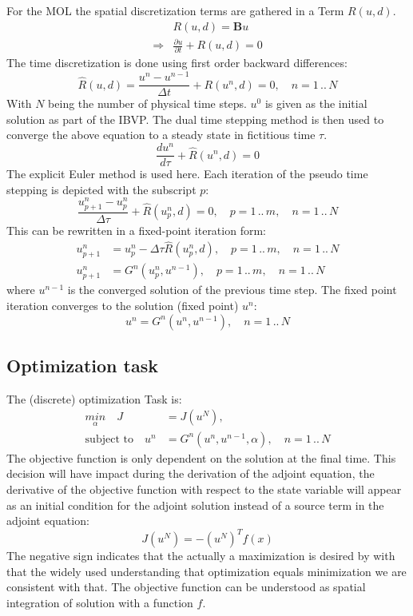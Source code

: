 For the MOL the spatial discretization terms are gathered in a Term $R(u,d)$.
\begin{align}
&R(u,d) = \mathbf{B}u  \\
\Rightarrow & \frac{\partial u}{\partial t} + R(u,d) = 0
\end{align}
The time discretization is done using first order backward differences:
\begin{equation}
\hat R (u,d) = \frac{u^{n} - u^{n-1}}{\Delta t} + R(u^n,d) = 0,\quad n= 1\,..\,N
\end{equation}
With $N$ being the number of physical time steps. $u^0$ is given as the initial solution as part of the IBVP. The dual time stepping method is then used to converge the above equation to a steady state in fictitious time $\tau$. 
\begin{equation}
\frac{d u^n}{d\tau} + \hat R(u^{n},d) = 0
\end{equation} 
The explicit Euler method is used here. Each iteration of the pseudo time stepping is depicted with the subscript $p$:
\begin{equation}
\frac{u^n_{p+1}-u^n_{p}}{\Delta\tau} + \hat R(u^{n}_{p},d) = 0,\quad p= 1\,..\,m,\quad n= 1\,..\,N
\end{equation} 
This can be rewritten in a fixed-point iteration form:
\begin{align}
u^n_{p+1} &= u^n_{p} - \Delta\tau\hat R(u^{n}_{p},d),\quad p= 1\,..\,m,\quad n= 1\,..\,N\\
u^n_{p+1} &= G^n \left( u^n_p, u^{n-1} \right),\quad p= 1\,..\,m,\quad n= 1\,..\,N
\end{align}
where $u^{n-1}$ is the converged solution of the previous time step. The fixed point iteration converges to the solution (fixed point) $u^n$:
\begin{equation}
u^n = G^n\left( u^n, u^{n-1} \right),\quad n= 1\,..\,N
\end{equation}
\subsection{Optimization task}
The (discrete) optimization Task is:
\begin{align}
\underset{\alpha}{min}\quad J &= J(u^N), \\
\text{subject to}\quad u^n &= G^n \left( u^n, u^{n-1}, \alpha \right),\quad n= 1\,..\,N
\end{align}
The objective function is only dependent on the solution at the final time. This decision will have impact during the derivation of the adjoint equation, the derivative of the objective function with respect to the state variable will appear as an initial condition for the adjoint solution instead of a source term in the adjoint equation:
\begin{equation}
J(u^N) = -(u^N)^T f(x)
\end{equation}
The negative sign indicates that the actually a maximization is desired by with that the widely used understanding that optimization equals minimization we are consistent with that. 
The objective function can be understood as spatial integration of solution with a function $f$.